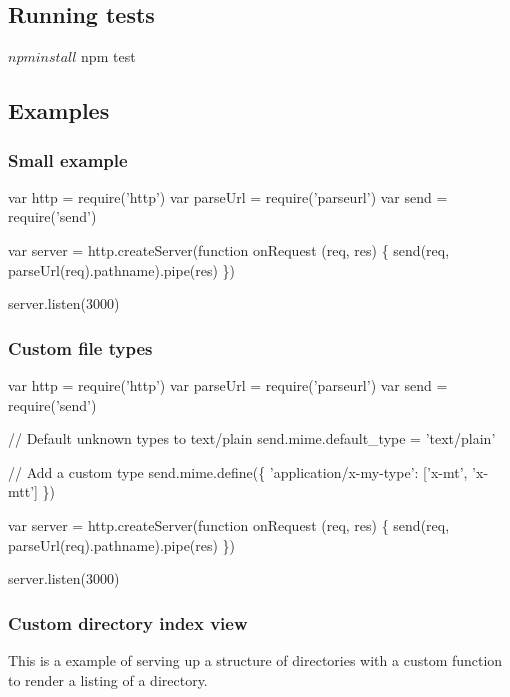 \subsection*{Running tests}


\begin{DoxyCode}
$ npm install
$ npm test
\end{DoxyCode}


\subsection*{Examples}

\subsubsection*{Small example}


\begin{DoxyCode}
var http = require('http')
var parseUrl = require('parseurl')
var send = require('send')

var server = http.createServer(function onRequest (req, res) \{
  send(req, parseUrl(req).pathname).pipe(res)
\})

server.listen(3000)
\end{DoxyCode}


\subsubsection*{Custom file types}


\begin{DoxyCode}
var http = require('http')
var parseUrl = require('parseurl')
var send = require('send')

// Default unknown types to text/plain
send.mime.default\_type = 'text/plain'

// Add a custom type
send.mime.define(\{
  'application/x-my-type': ['x-mt', 'x-mtt']
\})

var server = http.createServer(function onRequest (req, res) \{
  send(req, parseUrl(req).pathname).pipe(res)
\})

server.listen(3000)
\end{DoxyCode}


\subsubsection*{Custom directory index view}

This is a example of serving up a structure of directories with a custom function to render a listing of a directory.


